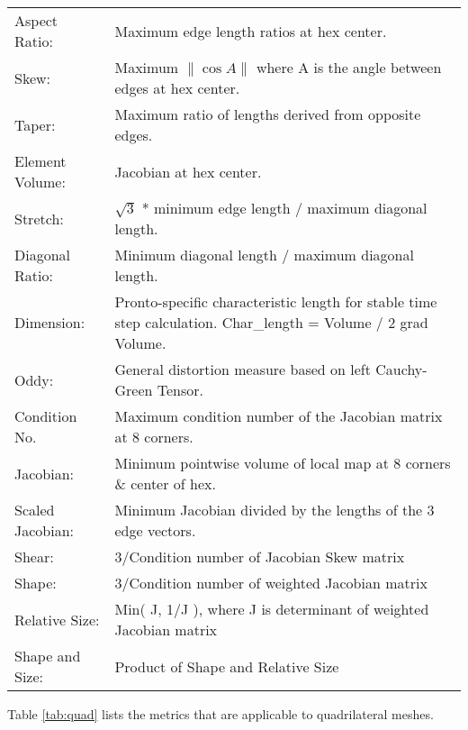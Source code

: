 \documentclass[10pt]{report}
\begin{document}
\begin{appendix}
\begin{tabular}{lp{4in}}
Aspect Ratio:& 
  Maximum edge length ratios at hex center. \\
Skew:      & 
  Maximum $\|\cos A\|$ where A is the angle between edges at hex center. \\
Taper:       & 
  Maximum ratio of lengths derived from opposite edges. \\
Element Volume:  & 
  Jacobian at hex center. \\
Stretch:         &  
  $\sqrt{3}$ * minimum edge length / maximum diagonal length. \\
Diagonal Ratio:  & 
  Minimum diagonal length / maximum diagonal length. \\
Dimension:       & 
  Pronto-specific characteristic length for stable time step calculation.      Char\_length = Volume / 2 grad Volume. \\
Oddy: & 
  General distortion measure based on left Cauchy-Green Tensor. \\
Condition No. & 
  Maximum condition number of the Jacobian matrix at 8 corners. \\
Jacobian: & 
  Minimum pointwise volume of local map at 8 corners \& center of hex. \\
Scaled Jacobian:& 
  Minimum Jacobian divided by the lengths of the 3 edge vectors. \\
Shear:           & 
  3/Condition number of Jacobian Skew matrix \\
Shape:           & 
  3/Condition number of weighted Jacobian matrix \\
Relative Size:   & 
  Min( J, 1/J ), where J is determinant of weighted Jacobian matrix \\
Shape and Size:  & 
  Product of Shape and Relative Size \\
\end{tabular}
\T\newpage
\htmlrule

Table \ref{tab:quad}
lists the metrics that are applicable to quadrilateral meshes.  


\end{appendix}
\end{document}
